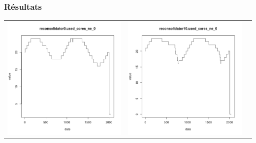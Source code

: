 \documentclass{beamer}
\begin{document}
\begin{frame}
	\frametitle{Résultats}
	\begin{tabular}{ccc}
\includegraphics[scale=0.22]{reconsolidator0_used_cores_ne_0}&
\includegraphics[scale=0.22]{reconsolidator10_used_cores_ne_0}&

\end{tabular}
\end{frame}
\end{document}
